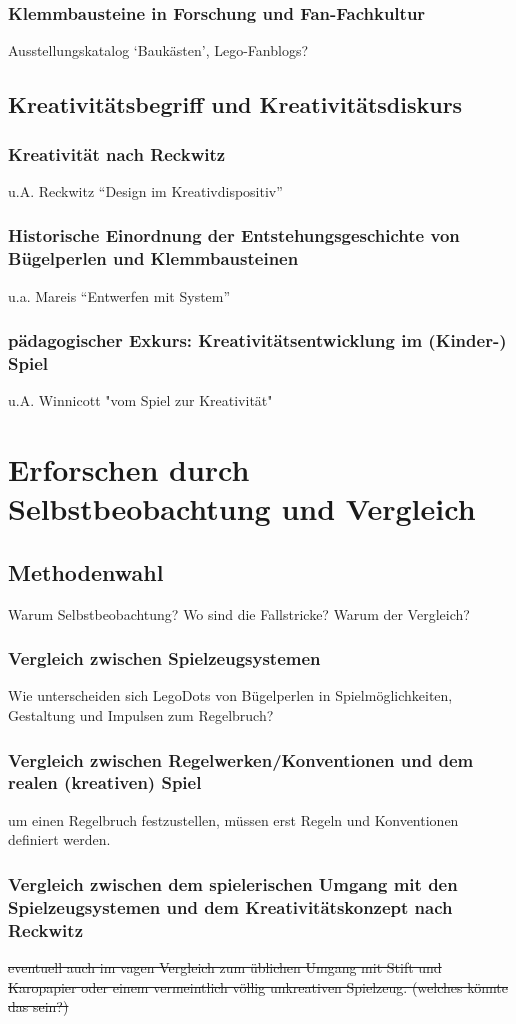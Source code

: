 \documentclass[11pt,a4paper,twoside]{scrreprt}
\begin{document}
		\subsection{Klemmbausteine in Forschung und Fan-Fachkultur}
		Ausstellungskatalog `Baukästen', Lego-Fanblogs?

	\section{Kreativitätsbegriff und Kreativitätsdiskurs}
		\subsection{Kreativität nach Reckwitz}
		u.A. Reckwitz ``Design im Kreativdispositiv''
		\subsection{Historische Einordnung der Entstehungsgeschichte von Bügelperlen und Klemmbausteinen}
		u.a. Mareis ``Entwerfen mit System''
		\subsection{pädagogischer Exkurs: Kreativitätsentwicklung im (Kinder-) Spiel}
		u.A. Winnicott "vom Spiel zur Kreativität"



\chapter{Erforschen durch Selbstbeobachtung und Vergleich}
	\section{Methodenwahl}
	Warum Selbstbeobachtung? Wo sind die Fallstricke? Warum der Vergleich? 
		\subsection{Vergleich zwischen Spielzeugsystemen}
		Wie unterscheiden sich LegoDots von Bügelperlen in Spielmöglichkeiten, Gestaltung und Impulsen zum Regelbruch?
		\subsection{Vergleich zwischen Regelwerken/Konventionen und dem realen (kreativen) Spiel}
		um einen Regelbruch festzustellen, müssen erst Regeln und Konventionen definiert werden.
		\subsection{Vergleich zwischen dem spielerischen Umgang mit den Spielzeugsystemen und dem Kreativitätskonzept nach Reckwitz}
		\sout{eventuell auch im vagen Vergleich zum üblichen Umgang mit Stift und Karopapier oder einem vermeintlich völlig unkreativen Spielzeug. (welches könnte das sein?)}
\end{document}
